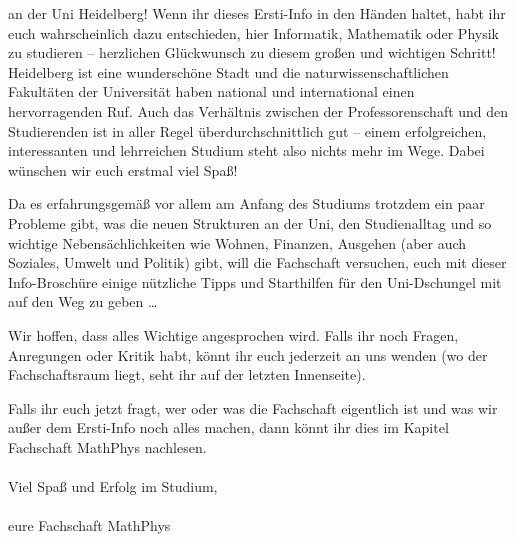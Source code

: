 an der Uni Heidelberg! Wenn ihr dieses Ersti-Info in den Händen haltet, habt ihr euch wahrscheinlich dazu entschieden, hier Informatik, Mathematik oder Physik zu studieren -- herzlichen Glückwunsch zu diesem großen und wichtigen Schritt! Heidelberg ist eine wunderschöne Stadt und die naturwissenschaftlichen Fakultäten der Universität haben national und international einen hervorragenden Ruf. Auch das Verhältnis zwischen der Professorenschaft und den Studierenden ist in aller Regel überdurchschnittlich gut -- einem erfolgreichen, interessanten und lehrreichen Studium steht also nichts mehr im Wege. Dabei wünschen wir euch erstmal viel Spaß! \smiley

Da es erfahrungsgemäß vor allem am Anfang des Studiums trotzdem ein paar Probleme gibt, was die neuen Strukturen an der Uni, den Studienalltag und so wichtige Nebensächlichkeiten wie Wohnen, Finanzen, Ausgehen (aber auch Soziales, Umwelt und Politik) gibt, will die Fachschaft versuchen, euch mit dieser Info-Broschüre einige nützliche Tipps und Starthilfen für den Uni-Dschungel mit auf den Weg zu geben \dots


Wir hoffen, dass alles Wichtige angesprochen wird. Falls ihr noch Fragen, Anregungen oder Kritik habt, könnt ihr euch jederzeit an uns wenden (wo der Fachschaftsraum liegt, seht ihr auf der letzten Innenseite).

Falls ihr euch jetzt fragt, wer oder was die Fachschaft eigentlich ist und was wir außer dem Ersti-Info noch alles machen, dann könnt ihr dies im Kapitel Fachschaft MathPhys nachlesen. \\\\
\noindent Viel Spaß und Erfolg im Studium,\\\\

eure Fachschaft MathPhys
